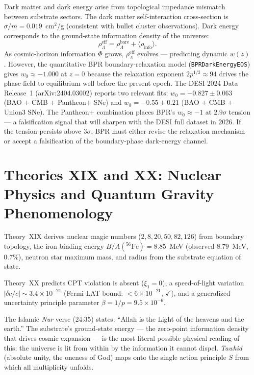 \documentclass[12pt,oneside]{book}
\theoremstyle{definition}
\newcommand{\rhoinfo}{\rho_{\mathrm{info}}}
\begin{document}
Dark matter and dark energy arise from topological impedance mismatch between
substrate sectors. The dark matter self-interaction cross-section is
$\sigma/m = 0.019$~cm$^2$/g (consistent with bullet cluster observations).
Dark energy corresponds to the ground-state information density of the universe:
\begin{equation}
  \rho^\mathrm{eff}_\Lambda = \rho^\mathrm{bare}_\Lambda + \langle\rhoinfo\rangle.
\end{equation}
As cosmic-horizon information $\Phi$ grows, $\rho_\Lambda^\mathrm{eff}$ evolves ---
predicting dynamic $w(z)$.  However, the quantitative BPR boundary-relaxation model
(\texttt{BPRDarkEnergyEOS}) gives $w_0 \approx -1.000$ at $z=0$ because the relaxation
exponent $2p^{1/3} \approx 94$ drives the phase field to equilibrium well before the
present epoch.  The DESI 2024 Data Release~1 (arXiv:2404.03002) reports two relevant fits:
$w_0 = -0.827 \pm 0.063$ (BAO + CMB + Pantheon+ SNe) and $w_0 = -0.55 \pm 0.21$
(BAO + CMB + Union3 SNe).  The Pantheon+ combination places BPR's $w_0 \approx -1$ at
$2.9\sigma$ tension --- a falsification signal that will sharpen with the DESI full
dataset in 2026.  If the tension persists above $3\sigma$, BPR must either revise the
relaxation mechanism or accept a falsification of the boundary-phase dark-energy channel.

\section{Theories XIX and XX: Nuclear Physics and Quantum Gravity Phenomenology}

Theory~XIX derives nuclear magic numbers ($2, 8, 20, 50, 82, 126$) from boundary
topology, the iron binding energy $B/A({}^{56}\mathrm{Fe}) = 8.85$~MeV
(observed $8.79$~MeV, 0.7\%), neutron star maximum mass, and radius from the
substrate equation of state.

Theory~XX predicts CPT violation is absent ($\xi_1 = 0$), a speed-of-light
variation $|\delta c/c| \sim 3.4\times10^{-21}$ (Fermi-LAT bound:
$< 6\times10^{-21}$, $\checkmark$), and a generalized uncertainty principle
parameter $\beta = 1/p = 9.5\times10^{-6}$.

\begin{resonance}
The Islamic \textit{Nur} verse (24:35) states: ``Allah is the Light of the heavens
and the earth.'' The substrate's ground-state energy --- the zero-point information
density that drives cosmic expansion --- is the most literal possible physical
reading of this: the universe is lit from within by the information it cannot
dispel. \textit{Tawhid} (absolute unity, the oneness of God) maps onto the single
action principle $S$ from which all multiplicity unfolds.
\end{resonance}
\end{document}

